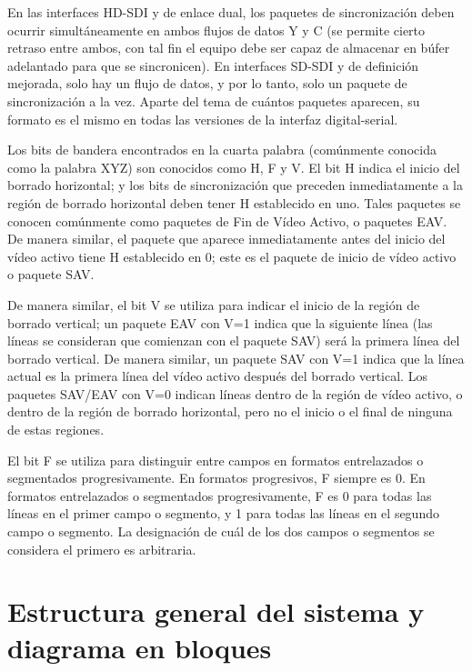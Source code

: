   En las interfaces HD-SDI y de enlace dual, los paquetes de sincronización deben
  ocurrir simultáneamente en ambos flujos de datos Y y C (se permite cierto retraso
  entre ambos, con tal fin el equipo debe ser capaz de almacenar en búfer adelantado
  para que se sincronicen). En interfaces SD-SDI y de definición mejorada, solo
  hay un flujo de datos, y por lo tanto, solo un paquete de sincronización a la
  vez. Aparte del tema de cuántos paquetes aparecen, su formato es el mismo en
  todas las versiones de la interfaz digital-serial.

  Los bits de bandera encontrados en la cuarta palabra (comúnmente conocida como la palabra XYZ)
  son conocidos como H, F y V. El bit H indica el inicio del borrado horizontal; y los bits de
  sincronización que preceden inmediatamente a la región de borrado horizontal deben tener H
  establecido en uno. Tales paquetes se conocen comúnmente como paquetes de Fin de Vídeo Activo, o
  paquetes EAV\@. De manera similar, el paquete que aparece inmediatamente antes del inicio del vídeo
  activo tiene H establecido en 0; este es el paquete de inicio de vídeo activo o paquete SAV\@.

  De manera similar, el bit V se utiliza para indicar el inicio de la región de borrado vertical; un
  paquete EAV con V=1 indica que la siguiente línea (las líneas se consideran que comienzan con el
  paquete SAV) será la primera línea del borrado vertical. De manera similar, un paquete SAV con V=1
  indica que la línea actual es la primera línea del vídeo activo después del borrado vertical. Los
  paquetes SAV/EAV con V=0 indican líneas dentro de la región de vídeo activo, o dentro de la región
  de borrado horizontal, pero no el inicio o el final de ninguna de estas regiones.

  El bit F se utiliza para distinguir entre campos en formatos entrelazados o segmentados
  progresivamente. En formatos progresivos, F siempre es 0. En formatos entrelazados o segmentados
  progresivamente, F es 0 para todas las líneas en el primer campo o segmento, y 1 para todas las
  líneas en el segundo campo o segmento. La designación de cuál de los dos campos o segmentos se
  considera el primero es arbitraria.

\section{Estructura general del sistema y diagrama en bloques}

